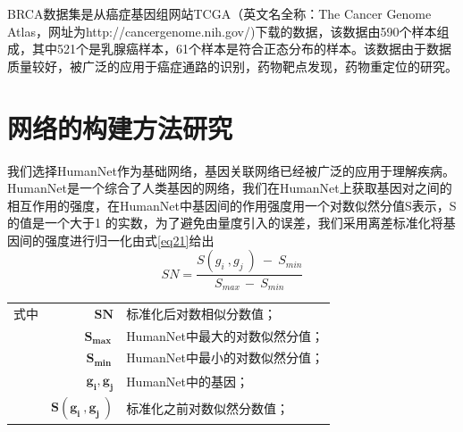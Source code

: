 BRCA数据集是从癌症基因组网站TCGA（英文名全称：The Cancer Genome Atlas，网址为http://cancergenome.nih.gov/)下载的数据，该数据由590个样本组成，其中521个是乳腺癌样本，61个样本是符合正态分布的样本。该数据由于数据质量较好，被广泛的应用于癌症通路的识别，药物靶点发现，药物重定位的研究。

\section{网络的构建方法研究}
我们选择HumanNet作为基础网络，基因关联网络已经被广泛的应用于理解疾病。HumanNet是一个综合了人类基因的网络，我们在HumanNet上获取基因对之间的相互作用的强度，在HumanNet中基因间的作用强度用一个对数似然分值S表示，S的值是一个大于1 的实数，为了避免由量度引入的误差，我们采用离差标准化将基因间的强度进行归一化由式\ref{eq21}给出
\begin{equation}\label{eq21}
SN=\frac{S( g_{i} \ ,g_{j} \ ) \ -\ S_{min}}{S_{max\ } -\ S_{min}}
\end{equation}

\begin{tabularx}{\textwidth}{@{}l@{\quad}r@{———}X@{}}
式中& $\boldsymbol{SN}$ & 标准化后对数相似分数值；\\
	& $\boldsymbol{S_{max\ }}$ &HumanNet中最大的对数似然分值；\\
	& $\boldsymbol{S_{min\ }}$ &HumanNet中最小的对数似然分值；\\
	 & $\boldsymbol{ g_{i}, g_{j}}$ &HumanNet中的基因；\\
	& $\boldsymbol{S( g_{i} \ ,g_{j} \ )}$ & 标准化之前对数似然分数值；\\
\end{tabularx}\vspace{3.15bp}

